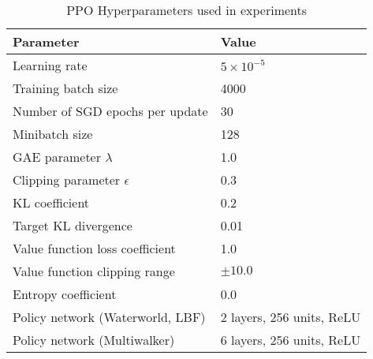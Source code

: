 \documentclass{article}
\begin{document}
\begin{table}[h]
    \centering
    \caption{PPO Hyperparameters used in experiments}
    \begin{tabular}{ll}
    \toprule
    \textbf{Parameter} & \textbf{Value} \\
    \midrule
    Learning rate & $5 \times 10^{-5}$ \\
    Training batch size & 4000 \\
    Number of SGD epochs per update & 30 \\
    Minibatch size & 128 \\
    GAE parameter $\lambda$ & 1.0 \\
    Clipping parameter $\epsilon$ & 0.3 \\
    KL coefficient & 0.2 \\
    Target KL divergence & 0.01 \\
    Value function loss coefficient & 1.0 \\
    Value function clipping range & $\pm 10.0$ \\
    Entropy coefficient & 0.0 \\
    Policy network (Waterworld, LBF) & 2 layers, 256 units, ReLU \\%
    Policy network (Multiwalker) & 6 layers, 256 units, ReLU \\%
    \bottomrule
    \end{tabular}
    \label{tab:ppo-hyperparams}
\end{table}

        
        
        
\end{document}
